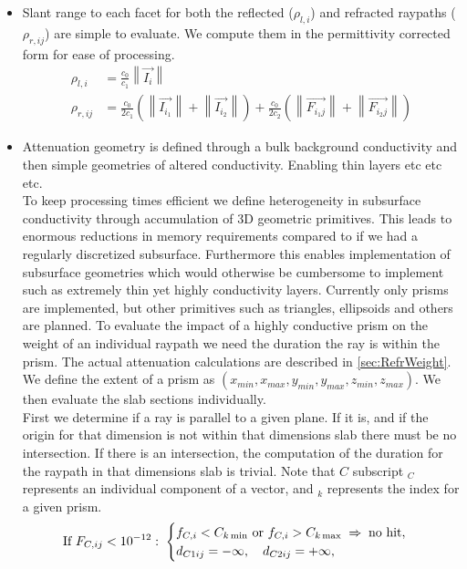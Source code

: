 \documentclass[lettersize,journal]{IEEEtran}
\begin{document}
\begin{itemize}
    \item 
    Slant range to each facet for both the reflected ($\rho_{l,i}$) and refracted raypaths ($\rho_{r,ij}$) are simple to evaluate. We compute them in the permittivity corrected form for ease of processing.
    \begin{align}
        \rho_{l,i} &= \frac{c_0}{c_1}\left\lVert\vec{I_i}\right\rVert \\
        \rho_{r,ij} &= \frac{c_0}{2c_1}\left(\left\lVert\vec{I_{i_1}}\right\rVert + \left\lVert\vec{I_{i_2}}\right\rVert \right) + \frac{c_0}{2c_2}\left(\left\lVert\vec{F_{{i_1}j}}\right\rVert + \left\lVert\vec{F_{{i_2}j}}\right\rVert\right)
    \end{align}
    \item Attenuation geometry is defined through a bulk background conductivity and then simple geometries of altered conductivity. Enabling thin layers etc etc etc. \\
    To keep processing times efficient we define heterogeneity in subsurface conductivity through accumulation of 3D geometric primitives. This leads to enormous reductions in memory requirements compared to if we had a regularly discretized subsurface. Furthermore this enables implementation of subsurface geometries which would otherwise be cumbersome to implement such as extremely thin yet highly conductivity layers. Currently only prisms are implemented, but other primitives such as triangles, ellipsoids and others are planned. To evaluate the impact of a highly conductive prism on the weight of an individual raypath we need the duration the ray is within the prism. The actual attenuation calculations are described in \ref{sec:RefrWeight}.\\
    We define the extent of a prism as $(x_{min},x_{max},y_{min},y_{max},z_{min},z_{max})$. We then evaluate the slab sections individually.\\
    First we determine if a ray is parallel to a given plane. If it is, and if the origin for that dimension is not within that dimensions slab there must be no intersection. If there is an intersection, the computation of the duration for the raypath in that dimensions slab is trivial. Note that $C$ subscript $_C$ represents an individual component of a vector, and $_k$ represents the index for a given prism.
    \begin{equation}
        \text{If } F_{C,ij} < 10^{-12}:\hspace{1mm}
        \begin{cases}
            f_{C,i} < C_{k\min} \ \text{or}\ f_{C,i} > C_{k\max} \;\Rightarrow\; \text{no hit},\\
            d_{C1ij} = -\infty,\quad d_{C2ij} = +\infty,
        \end{cases}
        \end{equation}
        

\end{itemize}
\end{document}
